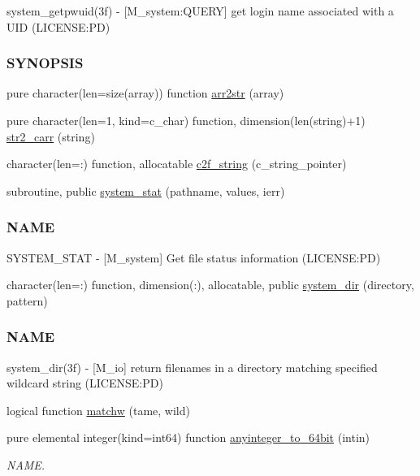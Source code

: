 \begin{DoxyCompactItemize}
\begin{DoxyCompactList}
system\+\_\+getpwuid(3f) -\/ \mbox{[}M\+\_\+system\+:Q\+U\+E\+RY\mbox{]} get login name associated with a U\+ID (L\+I\+C\+E\+N\+SE\+:PD) \subsubsection*{S\+Y\+N\+O\+P\+S\+IS}\end{DoxyCompactList}\item 
pure character(len=size(array)) function \mbox{\hyperlink{namespacem__system_aeb3d7d4cb39d59917910a3ae2532206d}{arr2str}} (array)
\item 
pure character(len=1, kind=c\+\_\+char) function, dimension(len(string)+1) \mbox{\hyperlink{namespacem__system_a58bb591b5b9fefec3960a28361aae07a}{str2\+\_\+carr}} (string)
\item 
character(len=\+:) function, allocatable \mbox{\hyperlink{namespacem__system_aa7c5445619aa15cd2301fe17f7c3b73c}{c2f\+\_\+string}} (c\+\_\+string\+\_\+pointer)
\item 
subroutine, public \mbox{\hyperlink{namespacem__system_a5bb1ebcebe181e07fd24e908cacc9887}{system\+\_\+stat}} (pathname, values, ierr)
\begin{DoxyCompactList}\small\item\em \subsubsection*{N\+A\+ME}

S\+Y\+S\+T\+E\+M\+\_\+\+S\+T\+AT -\/ \mbox{[}M\+\_\+system\mbox{]} Get file status information (L\+I\+C\+E\+N\+SE\+:PD) \end{DoxyCompactList}\item 
character(len=\+:) function, dimension(\+:), allocatable, public \mbox{\hyperlink{namespacem__system_a744f46033ef5e7ae95ec6cbff3ae3f89}{system\+\_\+dir}} (directory, pattern)
\begin{DoxyCompactList}\small\item\em \subsubsection*{N\+A\+ME}

system\+\_\+dir(3f) -\/ \mbox{[}M\+\_\+io\mbox{]} return filenames in a directory matching specified wildcard string (L\+I\+C\+E\+N\+SE\+:PD) \end{DoxyCompactList}\item 
logical function \mbox{\hyperlink{namespacem__system_a0fccb69d0a56044b05e85b8df9f90aea}{matchw}} (tame, wild)
\item 
pure elemental integer(kind=int64) function \mbox{\hyperlink{namespacem__system_a151da54be39dddcf270cceeff3243438}{anyinteger\+\_\+to\+\_\+64bit}} (intin)
\begin{DoxyCompactList}\small\item\em N\+A\+ME. \end{DoxyCompactList}\end{DoxyCompactItemize}
